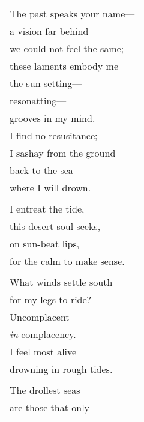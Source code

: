 \documentclass{article}
\begin{document}
\begin{center}
\textbf{} \\
\vspace*{2ex}
\begin{tabular}{l}
The past speaks your name--- \\
\hspace*{2em}a vision far behind--- \\
\hspace*{4em}we could not feel the same; \\
these laments embody me \\
\hspace*{2em}the sun setting---\\
\hspace*{4em}resonatting--- \\
grooves in my mind. \\
I find no resusitance; \\
\hspace*{2em}I sashay from the ground \\
back to the sea \\
\hspace*{2em}where I will drown. \\
\\
I entreat the tide, \\ %
\hspace*{2em}this desert-soul seeks, \\
\hspace*{4em}on sun-beat lips, \\
for the calm to make sense. \\
\\
What winds settle south \\
for my legs to ride? \\
\hspace*{2em}Uncomplacent\\
\hspace*{4em}\textit{in} complacency.\\ %
I feel most alive \\
\hspace*{2em}drowning in rough tides. \\
\\
The drollest seas \\
\hspace*{2em}are those that only \\

\end{tabular}
\end{center}
\end{document}
